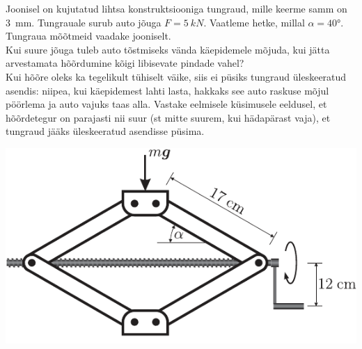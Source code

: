 \documentclass[10pt]{article}
\begin{document}
{%

Joonisel on kujutatud lihtsa konstruktsiooniga tungraud,
mille keerme samm on \SI{3}{mm}. Tungrauale surub auto jõuga $F = \SI{5}{kN}$. Vaatleme hetke, millal $\alpha = \ang{40}$. Tungraua mõõtmeid vaadake jooniselt.\\
\osa Kui suure jõuga tuleb auto tõstmiseks vända käepidemele mõjuda, kui jätta
arvestamata hõõrdumine kõigi libisevate pindade vahel?\\
\osa Kui hõõre oleks ka tegelikult tühiselt väike, siis ei püsiks tungraud üleskeeratud asendis: niipea, kui käepidemest lahti lasta, hakkaks see auto raskuse
mõjul pöörlema ja auto vajuks taas alla. Vastake eelmisele küsimusele eeldusel,
et hõõrdetegur on parajasti nii suur (st mitte suurem, kui hädapärast vaja),
et tungraud jääks üleskeeratud asendisse püsima.

\begin{center}
	\includegraphics[scale=0.9]{2011-v3g-10-tungraud}
\end{center}
\probend
\newpage

\bigskip


}
\end{document}
